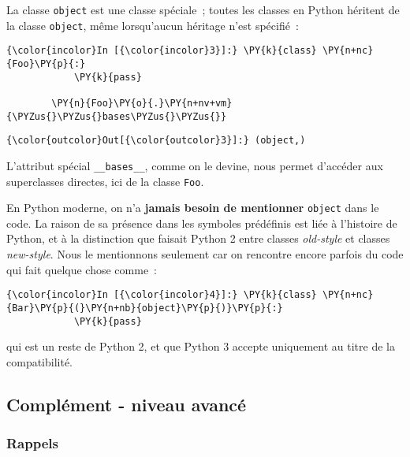     La classe \texttt{object} est une classe spéciale~; toutes les classes
en Python héritent de la classe \texttt{object}, même lorsqu'aucun
héritage n'est spécifié~:

    \begin{Verbatim}[commandchars=\\\{\},frame=single,framerule=0.3mm,rulecolor=\color{cellframecolor}]
{\color{incolor}In [{\color{incolor}3}]:} \PY{k}{class} \PY{n+nc}{Foo}\PY{p}{:}
            \PY{k}{pass}
        
        \PY{n}{Foo}\PY{o}{.}\PY{n+nv+vm}{\PYZus{}\PYZus{}bases\PYZus{}\PYZus{}}
\end{Verbatim}


\begin{Verbatim}[commandchars=\\\{\},frame=single,framerule=0.3mm,rulecolor=\color{cellframecolor}]
{\color{outcolor}Out[{\color{outcolor}3}]:} (object,)
\end{Verbatim}
            
    L'attribut spécial \texttt{\_\_bases\_\_}, comme on le devine, nous
permet d'accéder aux superclasses directes, ici de la classe
\texttt{Foo}.

    En Python moderne, on n'a \textbf{jamais besoin de mentionner}
\texttt{object} dans le code. La raison de sa présence dans les symboles
prédéfinis est liée à l'histoire de Python, et à la distinction que
faisait Python 2 entre classes \emph{old-style} et classes
\emph{new-style}. Nous le mentionnons seulement car on rencontre encore
parfois du code qui fait quelque chose comme~:

    \begin{Verbatim}[commandchars=\\\{\},frame=single,framerule=0.3mm,rulecolor=\color{cellframecolor}]
{\color{incolor}In [{\color{incolor}4}]:} \PY{k}{class} \PY{n+nc}{Bar}\PY{p}{(}\PY{n+nb}{object}\PY{p}{)}\PY{p}{:}
            \PY{k}{pass}
\end{Verbatim}


    qui est un reste de Python 2, et que Python 3 accepte uniquement au
titre de la compatibilité.

    \hypertarget{compluxe9ment---niveau-avancuxe9}{%
\subsection{Complément - niveau
avancé}\label{compluxe9ment---niveau-avancuxe9}}

    \hypertarget{rappels}{%
\subsubsection{Rappels}\label{rappels}}

